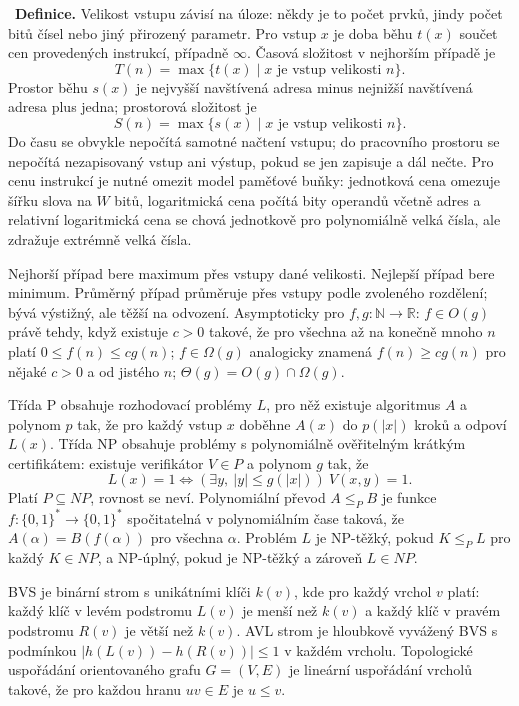 \begin{odpoved}
\setlength{\parskip}{2pt}
\noindent{}\ \textbf{Definice.}
Velikost vstupu závisí na úloze: někdy je to počet prvků, jindy počet bitů čísel nebo
jiný přirozený parametr. Pro vstup $x$ je doba běhu
$t(x)$ součet cen provedených instrukcí, případně $\infty$. Časová složitost v nejhorším
případě je
\[
T(n)=\max\{t(x)\mid x\text{ je vstup velikosti }n\}.
\]
Prostor běhu $s(x)$ je nejvyšší navštívená adresa minus nejnižší navštívená adresa plus
jedna; prostorová složitost je
\[
S(n)=\max\{s(x)\mid x\text{ je vstup velikosti }n\}.
\]
Do času se obvykle nepočítá samotné načtení vstupu; do pracovního prostoru se nepočítá
nezapisovaný vstup ani výstup, pokud se jen zapisuje a dál nečte. Pro cenu instrukcí je
nutné omezit model paměťové buňky: jednotková cena omezuje šířku slova na $W$ bitů,
logaritmická cena počítá bity operandů včetně adres a relativní logaritmická cena se
chová jednotkově pro polynomiálně velká čísla, ale zdražuje extrémně velká čísla.

Nejhorší případ bere maximum přes vstupy dané velikosti. Nejlepší případ bere minimum.
Průměrný případ průměruje přes vstupy podle zvoleného rozdělení; bývá výstižný, ale
těžší na odvození. Asymptoticky pro $f,g:\mathbb N\to\mathbb R$:
$f\in O(g)$ právě tehdy, když existuje $c>0$ takové, že pro všechna až na konečně mnoho
$n$ platí $0\le f(n)\le c g(n)$; $f\in\Omega(g)$ analogicky znamená
$f(n)\ge c g(n)$ pro nějaké $c>0$ a od jistého $n$; $\Theta(g)=O(g)\cap\Omega(g)$.

Třída P obsahuje rozhodovací problémy $L$, pro něž existuje algoritmus $A$ a polynom
$p$ tak, že pro každý vstup $x$ doběhne $A(x)$ do $p(|x|)$ kroků a odpoví $L(x)$.
Třída NP obsahuje problémy s polynomiálně ověřitelným krátkým certifikátem:
existuje verifikátor $V\in P$ a polynom $g$ tak, že
\[
L(x)=1 \Leftrightarrow (\exists y,\ |y|\le g(|x|))\ V(x,y)=1.
\]
Platí $P\subseteq NP$, rovnost se neví. Polynomiální převod $A\le_P B$ je funkce
$f:\{0,1\}^*\to\{0,1\}^*$ spočitatelná v polynomiálním čase taková, že
$A(\alpha)=B(f(\alpha))$ pro všechna $\alpha$. Problém $L$ je NP-těžký, pokud
$K\le_P L$ pro každý $K\in NP$, a NP-úplný, pokud je NP-těžký a zároveň $L\in NP$.

BVS je binární strom s unikátními klíči $k(v)$, kde pro každý vrchol $v$ platí:
každý klíč v levém podstromu $L(v)$ je menší než $k(v)$ a každý klíč v pravém podstromu
$R(v)$ je větší než $k(v)$. AVL strom je hloubkově vyvážený BVS s podmínkou
$|h(L(v))-h(R(v))|\le1$ v každém vrcholu. Topologické uspořádání orientovaného grafu
$G=(V,E)$ je lineární uspořádání vrcholů takové, že pro každou hranu $uv\in E$ je
$u\le v$.


\end{odpoved}
